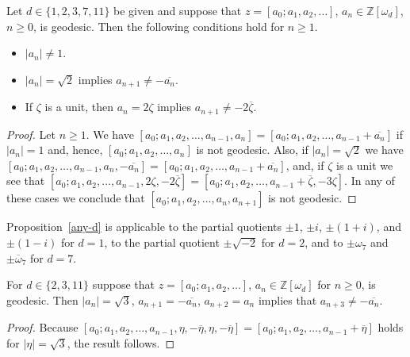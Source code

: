 \documentclass[graybox]{svmult}
\begin{document}
\begin{proposition}  \label{any-d}
Let $d \in\{ 1, 2, 3, 7, 11\}$ be given and suppose that $z = [a_{0}; a_{1}, a_{2}, \ldots ]$, $a_{n} \in \mathbb Z[\omega_{d}]$, $n \ge 0$, is geodesic. Then the following conditions hold for $n\ge 1$.
\begin{itemize}
\item[(i)]\;$|a_{n}| \ne 1$.
\item[(ii)]\;$|a_{n}| = \sqrt{2}$ implies $a_{n+1} \ne - \overline{a_{n}}$.
\item[(iii)]\; If $\zeta$ is a unit, then $a_{n} = 2 \zeta$ implies $a_{n+1} \ne - 2 \overline{\zeta}$. 
\end{itemize}
\end{proposition}
\begin{proof}
Let $n\ge 1$. We have  $[a_0;a_{1}, a_{2}, \ldots, a_{n-1}, a_{n}] = [a_0;a_{1}, a_{2}, \ldots, a_{n-1} + \overline{a_{n}}]$ 
if $|a_{n}|=1$ and, hence, $[a_0;a_{1}, a_{2}, \ldots, a_{n}]$ is not geodesic. Also, if $|a_{n}| = \sqrt{2}$ we have
$[a_0;a_{1}, a_{2}, \ldots, a_{n-1}, a_{n}, -\overline{a_{n}}] = 
[a_0;a_{1}, a_{2}, \ldots, a_{n-1} + \overline{a_{n}}]$, and,  if $\zeta$ is a unit we see that
$[a_0;a_{1}, a_{2}, \ldots, a_{n-1}, 2 \zeta, -2\overline{\zeta}] = [a_0;a_{1}, a_{2}, \ldots, a_{n-1} +  \overline{\zeta}, - 3 \zeta]$.  In any of these cases we conclude that $[a_0;a_{1}, a_{2}, \ldots, a_{n},a_{n+1}]$ is not geodesic.   
\end{proof}

Proposition~\ref{any-d} is applicable to the partial quotients $\pm 1$, $\pm i$, $\pm(1+i)$, and $\pm(1-i)$ for $d=1$, to the partial quotient $\pm\sqrt{-2}$ for $d=2$, and to $\pm \omega_{7}$ and $\pm \overline{\omega}_{7}$ for $d=7$. 

\begin{proposition}\label{prop:some-d}
For $d \in\{2, 3, 11\}$ suppose that $z = [a_{0}; a_{1}, a_{2}, \ldots ]$, $a_{n} \in \mathbb Z[\omega_{d}]$ for $n \ge 0$, is geodesic. Then 
$|a_{n}| = \sqrt{3}$, $a_{n+1} = - \overline{a_{n}}$, $a_{n+2} = a_{n}$ implies that
$a_{n+3} \ne -\overline{a_{n}}$. 
\end{proposition}
\begin{proof} 
Because $[a_0;a_{1}, a_{2}, \ldots, a_{n-1}, \eta, -\overline{\eta}, \eta, -\overline{\eta}] = 
[a_0;a_{1}, a_{2}, \ldots, a_{n-1} + \overline{\eta}] $ holds for $|\eta| = \sqrt{3}$, the result follows. 
\end{proof}
\end{document}
